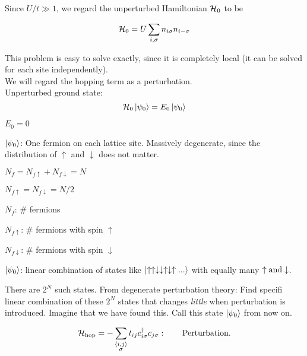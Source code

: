 Since $U/t \gg 1$, we regard the unperturbed Hamiltonian $\mathcal{H}_0$ to be

\begin{equation}
	\mathcal{H}_0 = U\sum_{i, \sigma} n_{i \sigma} n_{i -\sigma}
\end{equation}

This problem is easy to solve exactly, since it is completely local (it can be solved for each site independently).\\

We will regard the hopping term as a perturbation. \\

Unperturbed ground state:
\begin{equation}
	\mathcal{H}_0 \ket{\psi_0} = E_0 \ket{\psi_0}
\end{equation}

\begin{description}
	\item $E_0 = 0$
	\item $\ket{\psi_0}$: One fermion on each lattice site. Massively degenerate, since the distribution of $\uparrow$ and $\downarrow$ does not matter.
	
	\item $N_f = N_{f \uparrow} + N_{f \downarrow} = N $
	\item $N_{f \uparrow} = N_{f \downarrow} = N/2$
	
	\item $N_f$: \# fermions
	\item $N_{f\uparrow}$: \# fermions with spin $\uparrow$
	\item $N_{f\downarrow}$: \# fermions with spin $\downarrow$
	
	\item $\ket{\psi_0}$: linear combination of states like $\ket{\uparrow\uparrow\downarrow\downarrow\uparrow\downarrow
		\uparrow...}$ with equally many $\uparrow \rm{and} \downarrow$.
\end{description}

There are $2^N$ such states. From degenerate perturbation theory: Find specifi linear combination of these $2^N$ states that changes \emph{little} when perturbation is introduced. Imagine that we have found this. Call this state $\ket{\psi_0}$ from now on.

\begin{equation}
	\mathcal{H}_{\text{hop}} = - \sum_{\substack{\langle i, j \rangle \\ \sigma}} t_{ij} c_{i\sigma}^\dagger c_{j\sigma}: \qquad \text{Perturbation.}
\end{equation}

